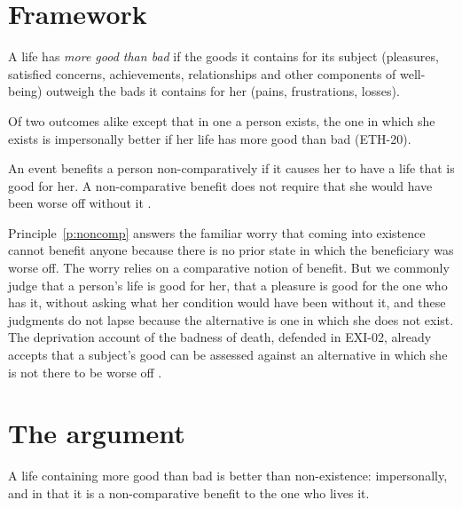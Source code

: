 \documentclass{situationist-preprint}
\begin{document}
\section{Framework}

\begin{definition}[Balance]\label{d:bal}
A life has \emph{more good than bad} if the goods it contains for its subject (pleasures, satisfied concerns, achievements, relationships and other components of well-being) outweigh the bads it contains for her (pains, frustrations, losses).
\end{definition}

\begin{principle}\label{p:imp}
Of two outcomes alike except that in one a person exists, the one in which she exists is impersonally better if her life has more good than bad (ETH-20).
\end{principle}

\begin{principle}\label{p:noncomp}
An event benefits a person non-comparatively if it causes her to have a life that is good for her. A non-comparative benefit does not require that she would have been worse off without it \citep{Holtug2001, Harman2009}.
\end{principle}

Principle~\ref{p:noncomp} answers the familiar worry that coming into existence cannot benefit anyone because there is no prior state in which the beneficiary was worse off. The worry relies on a comparative notion of benefit. But we commonly judge that a person's life is good for her, that a pleasure is good for the one who has it, without asking what her condition would have been without it, and these judgments do not lapse because the alternative is one in which she does not exist. The deprivation account of the badness of death, defended in EXI-02, already accepts that a subject's good can be assessed against an alternative in which she is not there to be worse off \citep{Nagel1970, Feldman1991}.

\section{The argument}

\begin{theorem}\label{t:main}
A life containing more good than bad is better than non-existence: impersonally, and in that it is a non-comparative benefit to the one who lives it.
\end{theorem}
\end{document}
